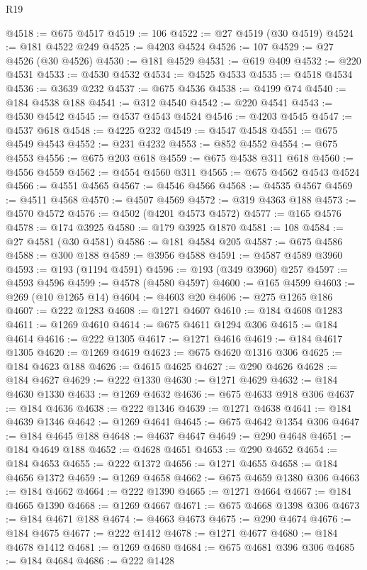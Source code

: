 \begin{lexlean}{R19}
\begin{coremodule}
@4518 := @675 @4517
@4519 := 106
@4522 := @27 @4519 (@30 @4519)
@4524 := @181 @4522 @249
@4525 := @4203 @4524
@4526 := 107
@4529 := @27 @4526 (@30 @4526)
@4530 := @181 @4529
@4531 := @619 @409
@4532 := @220 @4531
@4533 := @4530 @4532
@4534 := @4525 @4533
@4535 := @4518 @4534
@4536 := @3639 @232
@4537 := @675 @4536
@4538 := @4199 @74
@4540 := @184 @4538 @188
@4541 := @312 @4540
@4542 := @220 @4541
@4543 := @4530 @4542
@4545 := @4537 @4543 @4524
@4546 := @4203 @4545
@4547 := @4537 @618
@4548 := @4225 @232
@4549 := @4547 @4548
@4551 := @675 @4549 @4543
@4552 := @231 @4232
@4553 := @852 @4552
@4554 := @675 @4553
@4556 := @675 @203 @618
@4559 := @675 @4538 @311 @618
@4560 := @4556 @4559
@4562 := @4554 @4560 @311
@4565 := @675 @4562 @4543 @4524
@4566 := @4551 @4565
@4567 := @4546 @4566
@4568 := @4535 @4567
@4569 := @4511 @4568
@4570 := @4507 @4569
@4572 := @319 @4363 @188
@4573 := @4570 @4572
@4576 := @4502 (@4201 @4573 @4572)
@4577 := @165 @4576
@4578 := @174 @3925
@4580 := @179 @3925 @1870
@4581 := 108
@4584 := @27 @4581 (@30 @4581)
@4586 := @181 @4584 @205
@4587 := @675 @4586
@4588 := @300 @188
@4589 := @3956 @4588
@4591 := @4587 @4589 @3960
@4593 := @193 (@1194 @4591)
@4596 := @193 (@349 @3960) @257
@4597 := @4593 @4596
@4599 := @4578 (@4580 @4597)
@4600 := @165 @4599
@4603 := @269 (@10 @1265 @14)
@4604 := @4603 @20
@4606 := @275 @1265 @186
@4607 := @222 @1283
@4608 := @1271 @4607
@4610 := @184 @4608 @1283
@4611 := @1269 @4610
@4614 := @675 @4611 @1294 @306
@4615 := @184 @4614
@4616 := @222 @1305
@4617 := @1271 @4616
@4619 := @184 @4617 @1305
@4620 := @1269 @4619
@4623 := @675 @4620 @1316 @306
@4625 := @184 @4623 @188
@4626 := @4615 @4625
@4627 := @290 @4626
@4628 := @184 @4627
@4629 := @222 @1330
@4630 := @1271 @4629
@4632 := @184 @4630 @1330
@4633 := @1269 @4632
@4636 := @675 @4633 @918 @306
@4637 := @184 @4636
@4638 := @222 @1346
@4639 := @1271 @4638
@4641 := @184 @4639 @1346
@4642 := @1269 @4641
@4645 := @675 @4642 @1354 @306
@4647 := @184 @4645 @188
@4648 := @4637 @4647
@4649 := @290 @4648
@4651 := @184 @4649 @188
@4652 := @4628 @4651
@4653 := @290 @4652
@4654 := @184 @4653
@4655 := @222 @1372
@4656 := @1271 @4655
@4658 := @184 @4656 @1372
@4659 := @1269 @4658
@4662 := @675 @4659 @1380 @306
@4663 := @184 @4662
@4664 := @222 @1390
@4665 := @1271 @4664
@4667 := @184 @4665 @1390
@4668 := @1269 @4667
@4671 := @675 @4668 @1398 @306
@4673 := @184 @4671 @188
@4674 := @4663 @4673
@4675 := @290 @4674
@4676 := @184 @4675
@4677 := @222 @1412
@4678 := @1271 @4677
@4680 := @184 @4678 @1412
@4681 := @1269 @4680
@4684 := @675 @4681 @396 @306
@4685 := @184 @4684
@4686 := @222 @1428

\end{coremodule}
\end{lexlean}
